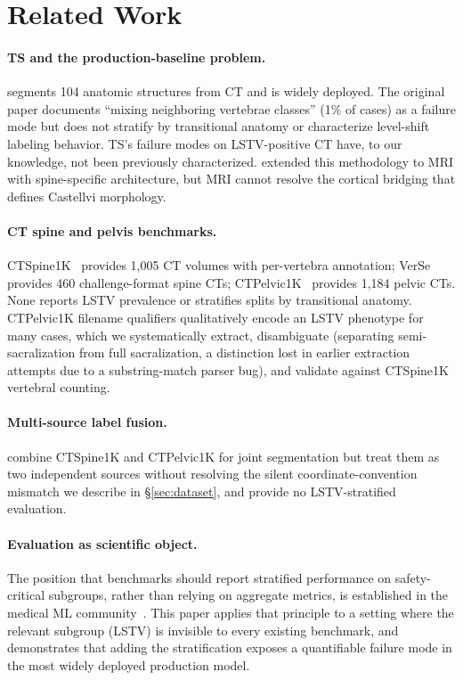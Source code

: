 \documentclass{article}
\begin{document}
\section{Related Work}
\label{sec:related}

\paragraph{TS{} and the production-baseline problem.}
\citet{Wasserthal2023TotalSegmentator:Images} segments 104 anatomic
structures from CT and is widely deployed.
The original paper documents ``mixing neighboring vertebrae
classes'' (1\% of cases) as a failure mode but does not stratify
by transitional anatomy or characterize level-shift labeling
behavior. TS's failure modes on LSTV-positive CT have, to our
knowledge, not been previously characterized.
\citet{Warszawer2025TotalSpineSeg:MRI} extended this methodology
to MRI with spine-specific architecture, but MRI cannot resolve
the cortical bridging that defines Castellvi morphology.

\paragraph{CT spine and pelvis benchmarks.}
CTSpine1K~\citep{Deng2021CTSpine1K:Tomography} provides 1{,}005 CT volumes
with per-vertebra annotation;
VerSe~\citep{Sekuboyina2020VerSe:Benchmark} provides 460 challenge-format
spine CTs; CTPelvic1K~\citep{Liu2021DeepModels} provides 1{,}184
pelvic CTs.
None reports LSTV prevalence or stratifies splits by transitional
anatomy.
CTPelvic1K filename qualifiers qualitatively encode an LSTV
phenotype for many cases, which we systematically extract,
disambiguate (separating semi-sacralization from full
sacralization, a distinction lost in earlier extraction
attempts due to a substring-match parser bug), and validate
against CTSpine1K vertebral counting.

\paragraph{Multi-source label fusion.}
\citet{Li2025LumbarMechanism} combine CTSpine1K and CTPelvic1K for
joint segmentation but treat them as two independent sources
without resolving the silent coordinate-convention mismatch we
describe in \S\ref{sec:dataset}, and provide no LSTV-stratified
evaluation.

\paragraph{Evaluation as scientific object.}
The position that benchmarks should report stratified performance
on safety-critical subgroups, rather than relying on aggregate
metrics, is established in the medical ML
community~\citep{Sang2025BenchmarkChallenge,Pieper2024Spine1}.
This paper applies that principle to a setting where the relevant
subgroup (LSTV) is invisible to every existing benchmark, and
demonstrates that adding the stratification exposes a quantifiable
failure mode in the most widely deployed production model.
\end{document}

